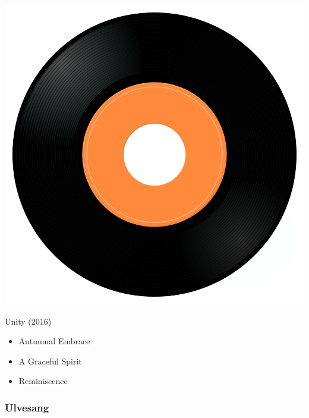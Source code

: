 \begin{minipage}[t]{0.25\textwidth}
\captionsetup{type=figure}
\includegraphics[width=\textwidth]{Images/cover.png}
\caption*{Unity (2016)}
\end{minipage}
\begin{minipage}[t]{0.25\textwidth}\vspace{0pt}
\begin{itemize}[nosep,leftmargin=1em,labelwidth=*,align=left]
	\setlength{\itemsep}{0pt}
	\item Autumnal Embrace
	\item A Graceful Spirit
	\item Reminiscence
\end{itemize}
\end{minipage}

\subsubsection{Ulvesang}

